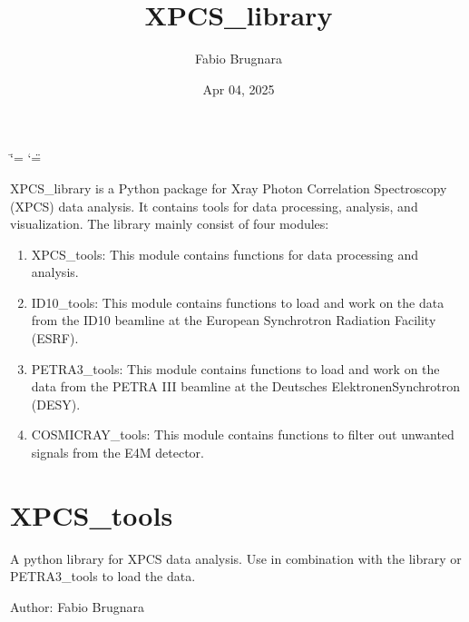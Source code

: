 \documentclass[letterpaper,10pt,english]{sphinxmanual}
\title{XPCS\_library}
\date{Apr 04, 2025}
\author{Fabio Brugnara}
\begin{document}
\ifdefined\shorthandoff
  \ifnum\catcode`\=\string=\active\shorthandoff{=}\fi
  \ifnum\catcode`\"=\active{}\fi
\fi

\pagestyle{empty}
\sphinxmaketitle
\pagestyle{plain}
\sphinxtableofcontents
\pagestyle{normal}
\label{\detokenize{index::doc}}


\sphinxAtStartPar
XPCS\_library is a Python package for X\sphinxhyphen{}ray Photon Correlation Spectroscopy (XPCS) data analysis. It contains tools for data processing, analysis, and visualization.
The library mainly consist of four modules:
\begin{enumerate}
%
\item {} 
\sphinxAtStartPar
XPCS\_tools: This module contains functions for data processing and analysis.

\item {} 
\sphinxAtStartPar
ID10\_tools: This module contains functions to load and work on the data from the ID10 beamline at the European Synchrotron Radiation Facility (ESRF).

\item {} 
\sphinxAtStartPar
PETRA3\_tools: This module contains functions to load and work on the data from the PETRA III beamline at the Deutsches Elektronen\sphinxhyphen{}Synchrotron (DESY).

\item {} 
\sphinxAtStartPar
COSMICRAY\_tools: This module contains functions to filter out unwanted signals from the E4M detector.

\end{enumerate}

\chapter{XPCS\_tools}
\label{\detokenize{index:xpcs-tools}}\label{\detokenize{index:module-XPCS_tools}}
\sphinxAtStartPar
A python library for XPCS data analysis. Use in combination with the library {\hyperref[\detokenize{index:id10-tools}]{}} or PETRA3\_tools to load the data.

\sphinxAtStartPar
Author: Fabio Brugnara

\begin{fulllineitems}
\label{\detokenize{index:XPCS_tools.E2lambda}}
\pysigstartsignatures
\pysiglinewithargsret
{}
{}
{}
\pysigstopsignatures
\end{fulllineitems}
\end{document}
